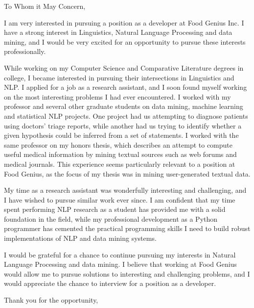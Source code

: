 
\signature{Walter Askew\\
1341 N Campbell\\
Chicago, IL 60622}

\begin{letter}{}


\opening{To Whom it May Concern,}
  
I am very interested in pursuing a position as a
developer at Food Genius Inc.
I have a strong interest in Linguistics, Natural Language
Processing and data mining, and I would be very excited for an
opportunity to pursue these interests professionally.

While working on my Computer Science and Comparative Literature
degrees in college, I became interested in pursuing their intersections
in Linguistics and NLP.
I applied for a job as a research assistant, and I soon found myself
working on the most interesting problems I had ever encountered. 
I worked with my professor and several other graduate students on data
mining, machine learning and statistical NLP projects.
One project had us attempting to diagnose patients using doctors'
triage reports, while another had us trying to identify whether a
given hypothesis could be inferred from a set of statements.
I worked with the same professor on my honors thesis, which describes
an attempt to compute useful medical information by mining textual
sources such as  web forums and medical journals.
This experience seems particularly relevant to a position at Food
Genius, as the focus of my thesis was in mining user-generated textual
data. 

My time as a research assistant was wonderfully interesting and
challenging, and I have wished to pursue similar work ever since.
I am confident that my time spent performing NLP research as a student
has provided me with a solid foundation in the field, while my
professional development as a Python programmer has cemented the
practical programming skills I need to build robust implementations of
NLP and data mining systems. 

I would be grateful for a chance to continue pursuing my interests in
Natural Language Processing and data mining.  
I believe that working at Food Genius would allow me to pursue
solutions to interesting and challenging problems, and I would
appreciate the chance to interview for a position as a developer.

\closing{Thank you for the opportunity,}
\end{letter}

